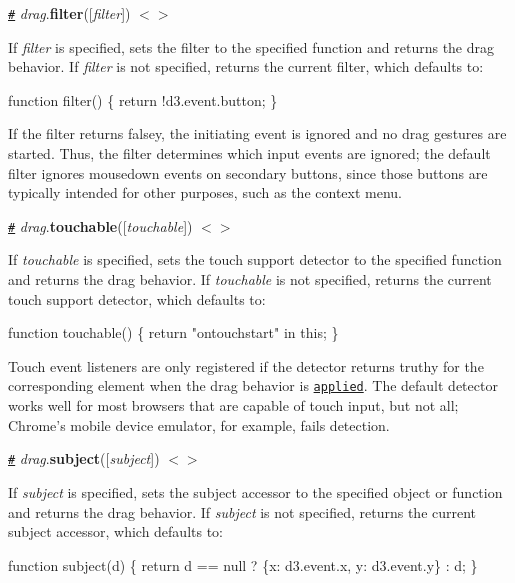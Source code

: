 \href{#drag_filter}{\tt \#} {\itshape drag}.{\bfseries filter}(\mbox{[}{\itshape filter}\mbox{]}) \href{https://github.com/d3/d3-drag/blob/master/src/drag.js#L141}{\tt $<$$>$}

If {\itshape filter} is specified, sets the filter to the specified function and returns the drag behavior. If {\itshape filter} is not specified, returns the current filter, which defaults to\+:


\begin{DoxyCode}
function filter() \{
  return !d3.event.button;
\}
\end{DoxyCode}


If the filter returns falsey, the initiating event is ignored and no drag gestures are started. Thus, the filter determines which input events are ignored; the default filter ignores mousedown events on secondary buttons, since those buttons are typically intended for other purposes, such as the context menu.

\href{#touchable}{\tt \#} {\itshape drag}.{\bfseries touchable}(\mbox{[}{\itshape touchable}\mbox{]}) \href{https://github.com/d3/d3-drag/blob/master/src/drag.js#L153}{\tt $<$$>$}

If {\itshape touchable} is specified, sets the touch support detector to the specified function and returns the drag behavior. If {\itshape touchable} is not specified, returns the current touch support detector, which defaults to\+:


\begin{DoxyCode}
function touchable() \{
  return "ontouchstart" in this;
\}
\end{DoxyCode}


Touch event listeners are only registered if the detector returns truthy for the corresponding element when the drag behavior is \href{#_drag}{\tt applied}. The default detector works well for most browsers that are capable of touch input, but not all; Chrome’s mobile device emulator, for example, fails detection.

\href{#drag_subject}{\tt \#} {\itshape drag}.{\bfseries subject}(\mbox{[}{\itshape subject}\mbox{]}) \href{https://github.com/d3/d3-drag/blob/master/src/drag.js#L149}{\tt $<$$>$}

If {\itshape subject} is specified, sets the subject accessor to the specified object or function and returns the drag behavior. If {\itshape subject} is not specified, returns the current subject accessor, which defaults to\+:


\begin{DoxyCode}
function subject(d) \{
  return d == null ? \{x: d3.event.x, y: d3.event.y\} : d;
\}
\end{DoxyCode}


